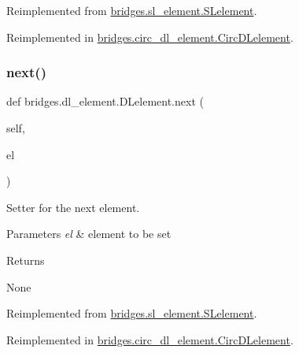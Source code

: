 Reimplemented from \mbox{\hyperlink{classbridges_1_1sl__element_1_1_s_lelement_acef793fc5e2533fb91795d01904e8b6d}{bridges.\+sl\+\_\+element.\+S\+Lelement}}.



Reimplemented in \mbox{\hyperlink{classbridges_1_1circ__dl__element_1_1_circ_d_lelement_a09b8b12344743709cce1d5fd926b88e9}{bridges.\+circ\+\_\+dl\+\_\+element.\+Circ\+D\+Lelement}}.

\mbox{\label{classbridges_1_1dl__element_1_1_d_lelement_ae46f630cd7384689d4305770e6b2c7c1}} 
\subsubsection{\texorpdfstring{next()}{next()}\hspace{0.1cm}{\footnotesize\ttfamily [2/2]}}
{\footnotesize\ttfamily def bridges.\+dl\+\_\+element.\+D\+Lelement.\+next (\begin{DoxyParamCaption}\item[{}]{self,  }\item[{}]{el }\end{DoxyParamCaption})}



Setter for the next element. 


\begin{DoxyParams}{Parameters}
{\em el} & element to be set \\
\hline
\end{DoxyParams}
\begin{DoxyReturn}{Returns}


None 
\end{DoxyReturn}


Reimplemented from \mbox{\hyperlink{classbridges_1_1sl__element_1_1_s_lelement_a210373939597f4c3bcc26fff98b4e44f}{bridges.\+sl\+\_\+element.\+S\+Lelement}}.



Reimplemented in \mbox{\hyperlink{classbridges_1_1circ__dl__element_1_1_circ_d_lelement_adb12e76948e7515f1987fc3bdbe0e861}{bridges.\+circ\+\_\+dl\+\_\+element.\+Circ\+D\+Lelement}}.

\mbox{\label{classbridges_1_1dl__element_1_1_d_lelement_a66e7c4bfb2216a68744fe58c24e9917f}} 
